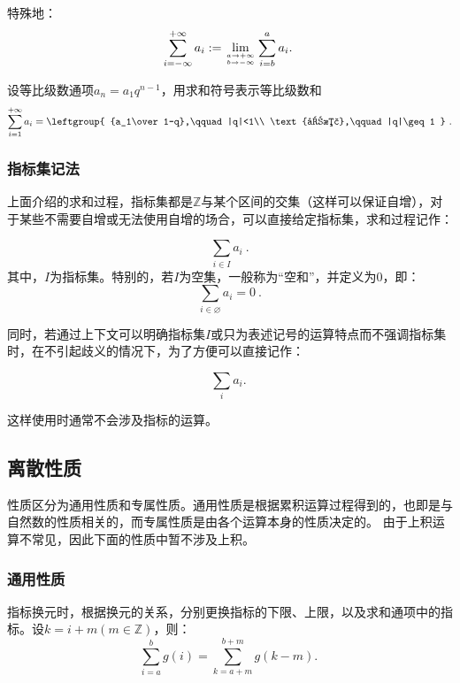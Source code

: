 特殊地：
\begin{equation}
\sum_{i=-\infty}^{+\infty} a_i:= \lim_{a\to+\infty\atop b\to-\infty}\sum_{i=b}^a a_i.~
\end{equation}

\begin{example}{设等比级数通项$a_n=a_1q^{n-1}$，用求和符号表示等比级数和}
$$
\sum_{i=1}^{+\infty} a_i=
\leftgroup{
{a_1\over 1-q},\qquad |q|<1\\  
\text{发散},\qquad |q|\geq1
} ~.
$$
\end{example}

\subsubsection{指标集记法}

上面介绍的求和过程，指标集都是$\mathbb{Z}$与某个区间的交集（这样可以保证自增），对于某些不需要自增或无法使用自增的场合，可以直接给定指标集，求和过程记作：

\begin{equation}
\sum_{i\in I} a_i~.
\end{equation}
其中，$I$为指标集。特别的，若$I$为空集，一般称为“空和”，并定义为0，即：
\begin{equation}
\sum_{i\in \varnothing} a_i=0~.
\end{equation}

同时，若通过上下文可以明确指标集$I$或只为表述记号的运算特点而不强调指标集时，在不引起歧义的情况下，为了方便可以直接记作：

\begin{equation}
\sum_i a_i.~
\end{equation}

这样使用时通常不会涉及指标的运算。

\subsection{离散性质}
性质区分为通用性质和专属性质。通用性质是根据累积运算过程得到的，也即是与自然数的性质相关的，而专属性质是由各个运算本身的性质决定的。
由于上积运算不常见，因此下面的性质中暂不涉及上积。
\subsubsection{通用性质}

指标换元时，根据换元的关系，分别更换指标的下限、上限，以及求和通项中的指标。设$k = i+m(m\in{\mathbb Z})$，则：
\begin{equation}
\sum_{i=a}^b g(i) = \sum_{k=a+m}^{b+m} g(k-m).~
\end{equation}


